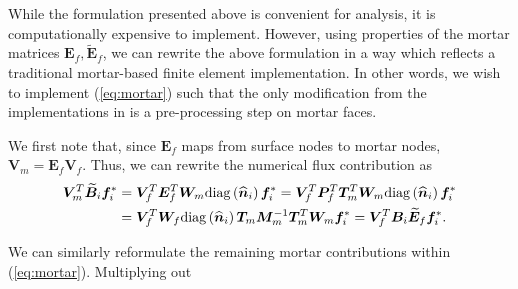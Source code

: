 \documentclass[review]{siamart0216}
\renewcommand{\tilde}{\widetilde}
\renewcommand{\hat}{\widehat}
\newcommand{\td}[2]{\frac{{\rm d}#1}{{\rm d}{\rm #2}}}
\newcommand{\LRp}[1]{\left( #1 \right)}
\newcommand{\diag}[1]{{\rm diag}\LRp{#1}}
\begin{document}
While the formulation presented above is convenient for analysis, it is computationally expensive to implement.  However, using properties of the mortar matrices $\bm{E}_f, \tilde{\bm{E}}_f$, we can rewrite the above formulation in a way which reflects a traditional mortar-based finite element implementation.  In other words, we wish to implement (\ref{eq:mortar}) such that the only modification from the implementations in \cite{chan2017discretely} is a pre-processing step on mortar faces.  

We first note that, since $\bm{E}_f$ maps from surface nodes to mortar nodes, $\bm{V}_m = \bm{E}_f \bm{V}_f$.  Thus, we can rewrite the numerical flux contribution as
\begin{align*}
 \bm{V}_m^T\tilde{\bm{B}}_i\bm{f}_i^* &= \bm{V}_f^T \bm{E}_f^T \bm{W}_m\diag{\hat{\bm{n}}_i} \bm{f}_i^* = \bm{V}_f^T  \bm{P}_f^T\bm{T}_m^T\bm{W}_m\diag{\hat{\bm{n}}_i} \bm{f}_i^*\\
 &= \bm{V}_f^T \bm{W}_f \diag{\hat{\bm{n}}_i} \bm{T}_m\bm{M}_m^{-1}\bm{T}_m^T\bm{W}_m \bm{f}_i^* =  \bm{V}_f^T \bm{B}_i \tilde{\bm{E}}_f\bm{f}_i^*.
\end{align*}

We can similarly reformulate the remaining mortar contributions within (\ref{eq:mortar}).  Multiplying out 

\end{document}
